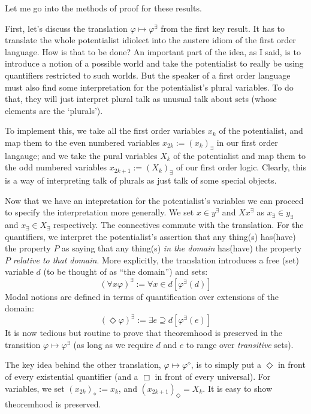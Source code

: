 \documentclass{article}
\begin{document}
Let me go into the methods of proof for these results. 

First, let's discuss the translation $\varphi \mapsto \varphi^\exists$ from the first key result.
It has to translate the whole potentialist idiolect into the austere idiom of the 
first order language. How is that to be done? An important part of the idea, as I said, is to introduce a
notion of a possible world and take the potentialist to really be using quantifiers 
restricted to such worlds. But the speaker of a first order language must also 
find some interpretation for the potentialist's plural variables. To do that, 
they will just interpret plural talk as unusual talk about sets (whose elements 
are the `plurals'). 

To implement this, we take all the 
first order variables $x_k$ of the potentialist, and 
map them to the even numbered variables $x_{2k} := (x_k)_\exists$ 
in our first order langauge; 
and we take the pural variables $X_k$ of the 
potentialist and map them to the odd numbered variables $x_{2k+1} := (X_k)_\exists$ 
of our first order logic. Clearly, this is a way of interpreting talk of 
plurals as just talk of some special objects.

Now that we have an intepretation for the potentialist's variables we can proceed to specify 
the interpretation more generally. We set $x \in y^\exists$ and $Xx^\exists$ as $x_\exists \in y_\exists$ 
and $x_\exists \in X_\exists$ respectively. The connectives commute with the translation. For the quantifiers,
we interpret the potentialist's assertion that any thing(s) has(have) the property $P$ as saying 
that any thing(s) \emph{in the domain} has(have) the property $P$ \emph{relative to that domain}. More explicitly, 
the translation introduces a free (set) variable $d$ (to be thought of as ``the domain'') and sets:
\[(\forall x \varphi)^\exists := \forall x \in d [\varphi^\exists(d)]\]
Modal notions are defined in terms of quantification over extensions of the domain:
\[ (\Diamond \varphi)^\exists := \exists e \supseteq d [\varphi^\exists(e)]\]
It is now tedious but routine to prove that theoremhood is preserved 
in the transition $\varphi \mapsto \varphi^\exists$ (as long as we require $d$ and $e$ 
to range over \emph{transitive} sets).

The key idea behind the other translation, $\varphi \mapsto \varphi^\diamond$, 
is to simply put a $\Diamond$ in front of every existential quantifier (and a $\Box$ in front of 
every universal). For variables, we set $(x_{2k})_\diamond := x_k$, and $(x_{2k+1})_\Diamond = X_k$.
It is easy to show theoremhood is preserved.
\end{document}
